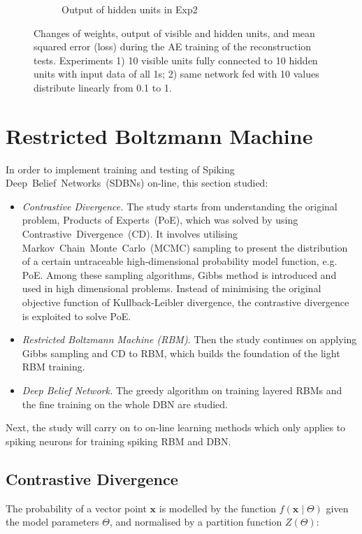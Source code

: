 \begin{figure}
\begin{subfigure}[t]{0.4\textwidth}
			\caption{Output of hidden units in Exp2}
		\end{subfigure}
		\caption{Changes of weights, output of visible and hidden units, and mean squared error (loss) during the AE training of the reconstruction tests. 
			Experiments 1) 10 visible units fully connected to 10 hidden units with input data of all 1s; 2) same network fed with 10 values distribute linearly from 0.1 to 1.}
	\end{figure}



\section{Restricted Boltzmann Machine}
In order to implement training and testing of Spiking Deep~Belief~Networks~(SDBNs) on-line, this section studied:
\begin{itemize}
	\item \textit{Contrastive Divergence.}
	The study starts from understanding the original problem, Products of Experts~(PoE), which was solved by using Contrastive~Divergence~(CD).
	It involves utilising Markov~Chain~Monte~Carlo~(MCMC) sampling to present the distribution of a certain untraceable high-dimensional probability model function, e.g. PoE.
	Among these sampling algorithms, Gibbs method is introduced and used in high dimensional problems.
	Instead of minimising the original objective function of Kullback-Leibler divergence, the contrastive divergence is exploited to solve PoE.
	\item \textit{Restricted Boltzmann Machine (RBM). }
	Then the study continues on applying Gibbs sampling and CD to RBM, which builds the foundation of the light RBM training.
	\item \textit{Deep Belief Network.} 
	The greedy algorithm on training layered RBMs and the fine training on the whole DBN are studied.
\end{itemize}
Next, the study will carry on to on-line learning methods which only applies to spiking neurons for training spiking RBM and DBN.
\subsection{Contrastive Divergence\cite{hinton2002training,woodfordnotes}}
The probability of a vector point $ \mathbf{x} $ is modelled by the function $f(\mathbf{x} \mid \Theta )$ given the model parameters $ \Theta $, and normalised by a partition function $Z( \Theta)$:

